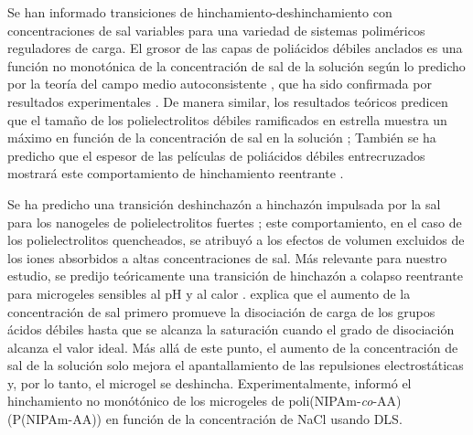 Se han informado transiciones de hinchamiento-deshinchamiento con concentraciones de sal variables para una variedad de sistemas polim\'ericos reguladores de carga.
El grosor de las capas de poli\'acidos d\'ebiles anclados es una funci\'on no monot\'onica de la concentraci\'on de sal de la soluci\'on seg\'un lo predicho por la teor\'ia del campo medio autoconsistente , que ha sido confirmada por resultados experimentales \addcite [Wu2007].
De manera similar, los resultados te\'oricos predicen que el tama\~no de los polielectrolitos d\'ebiles ramificados en estrella muestra un m\'aximo en funci\'on de la concentraci\'on de sal en la soluci\'on ;
Tambi\'en se ha predicho que el espesor de las pel\'iculas de poliácidos d\'ebiles entrecruzados mostrar\'a este comportamiento de hinchamiento reentrante .

Se ha predicho una transici\'on deshinchaz\'on a hinchaz\'on impulsada por la sal para los nanogeles de polielectrolitos fuertes ;
este comportamiento, en el caso de los polielectrolitos quencheados, se atribuy\'o a los efectos de volumen excluidos de los iones absorbidos a altas concentraciones de sal.
M\'as relevante para nuestro estudio, se predijo te\'oricamente una transici\'on de hinchaz\'on a colapso reentrante para microgeles sensibles al pH y al calor .
 explica que el aumento de la concentraci\'on de sal primero promueve la disociaci\'on de carga de los grupos \'acidos d\'ebiles hasta que se alcanza la saturaci\'on cuando el grado de disociaci\'on alcanza el valor ideal.
M\'as all\'a de este punto, el aumento de la concentraci\'on de sal de la soluci\'on solo mejora el apantallamiento de las repulsiones electrost\'aticas y, por lo tanto, el microgel se deshincha.
Experimentalmente,  inform\'o el hinchamiento no mon\'otónico de los microgeles de poli(NIPAm-\emph{co}-AA) (P(NIPAm-AA)) en funci\'on de la concentraci\'on de NaCl usando DLS.

